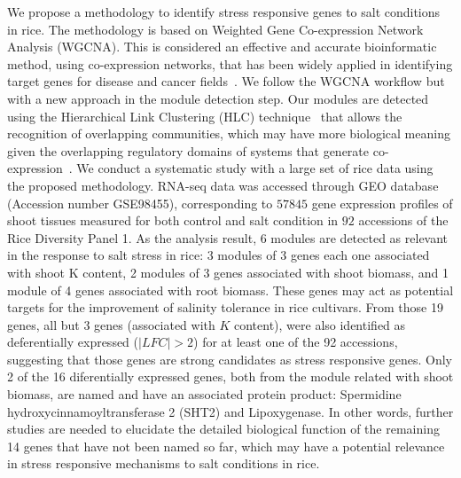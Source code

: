 \documentclass[12pt,journal, onecolumn]{IEEEtran}
\begin{document}
We propose a methodology to identify stress responsive genes to salt conditions in rice. The methodology is based on Weighted Gene Co-expression Network Analysis (WGCNA). This is considered an effective and accurate bioinformatic method, using co-expression networks, that has been widely applied in identifying target genes for disease and cancer fields~\cite{tian2018identifying}. We follow the WGCNA workflow but with a new approach in the module detection step. Our modules are detected using the Hierarchical Link Clustering (HLC) technique~\cite{ahn2010link} that allows the recognition of overlapping communities, which may have more biological meaning given the overlapping regulatory domains of systems that generate co-expression~\cite{gaiteri2014beyond}. We conduct a systematic study with a large set of rice data using the proposed methodology. RNA-seq data was accessed through GEO database~\cite{GEOAcces90:online} (Accession number GSE98455), corresponding to $57845$ gene expression profiles of shoot tissues measured for both control and salt condition in $92$ accessions of the Rice Diversity Panel 1. As the analysis result, 6 modules are detected as relevant in the response to salt stress in rice: 3 modules of 3 genes each one associated with shoot K content, 2 modules of 3 genes associated with  shoot biomass, and 1 module of 4 genes associated with root biomass. These genes may act as potential targets for the improvement of salinity tolerance in rice cultivars. From those 19 genes, all but 3 genes (associated with $K$ content), were also identified as deferentially expressed ($|LFC| > 2$) for at least one of the 92 accessions, suggesting that those genes are strong candidates as stress responsive genes. Only 2 of the 16 diferentially expressed genes, both from the module related with shoot biomass, are named and have an associated protein product: Spermidine hydroxycinnamoyltransferase 2 (SHT2) and Lipoxygenase. In other words, further studies are needed to elucidate the detailed biological function of the remaining 14 genes that have not been named so far,  which may have a potential relevance in stress responsive mechanisms to salt conditions in rice.\\
\end{document}
